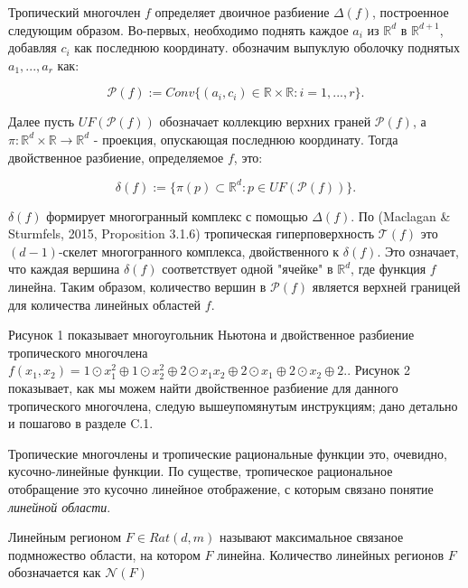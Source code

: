 \documentclass[russian]{lecture-notes}
\begin{document}
	Тропический многочлен $f$ определяет двоичное разбиение $\Delta(f)$, построенное следующим образом. Во-первых, необходимо поднять каждое $a_i$ из $\mathbb{R}^d$ в $\mathbb{R}^{d+1}$, добавляя $c_i$ как последнюю координату. обозначим выпуклую оболочку поднятых $a_1,...,a_r$ как:
	
	\begin{equation*}
		\mathcal{P}(f) := Conv\{(a_i, c_i) \in \mathbb{R} \times \mathbb{R} : i = 1,...,r\}.
	\end{equation*}
	
	Далее пусть $UF(\mathcal{P}(f))$ обозначает коллекцию верхних граней $\mathcal{P}(f)$, а $\pi : \mathbb{R}^d \times \mathbb{R} \to \mathbb{R}^d$ - проекция, опускающая последнюю координату. Тогда двойственное разбиение, определяемое $f$, это:
	
	\begin{equation*}
		\delta(f) := \{\pi (p) \subset \mathbb{R}^d : p \in UF(\mathcal{P}(f))\}.
	\end{equation*}
	
	$\delta(f)$ формирует многогранный комплекс с помощью $\Delta(f)$. По (Maclagan \& Sturmfels, 2015, Proposition 3.1.6) тропическая гиперповерхность $\mathcal{T}(f)$ это $(d-1)$-скелет многогранного комплекса, двойственного к $\delta(f)$. Это означает, что каждая вершина $\delta(f)$ соответствует одной "ячейке" в $\mathbb{R}^d$, где функция $f$ линейна. Таким образом, количество вершин в $\mathcal{P}(f)$ является верхней границей для количества линейных областей $f$.
	
	Рисунок 1 показывает многоугольник Ньютона и двойственное разбиение тропического многочлена $f(x_1, x_2) = 1 \odot x_1^2 \oplus 1 \odot x_2^2 \oplus 2 \odot x_1x_2 \oplus 2 \odot x_1 \oplus 2 \odot x_2 \oplus 2.$. Рисунок 2 показывает, как мы можем найти двойственное разбиение для данного тропического многочлена, следую вышеупомянутым инструкциям; дано детально и пошагово в разделе C.1.
	
	Тропические многочлены и тропические рациональные функции это, очевидно, кусочно-линейные функции. По существе, тропическое рациональное отобращение это кусочно линейное отображение, с которым связано понятие \textit{линейной области}.
	
	\begin{Definition}
		Линейным регионом $F \in Rat(d, m)$ называют максимальное связаное подмножество области, на котором $F$ линейна. Количество линейных регионов $F$ обозначается как $\mathcal{N}(F)$
	\end{Definition}
	
\end{document}
